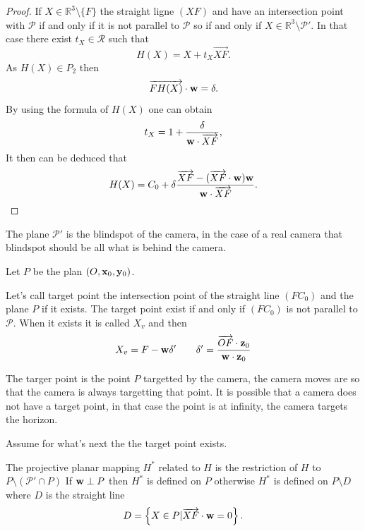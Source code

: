 \begin{proof}
If $X\in \mathbb{R}^3 \setminus \{F\}$ the straight ligne $(XF)$ and have an intersection point with $\mathcal{P}$ if and only if it is not parallel to  $\mathcal{P}$ so if and only if $X\in \mathbb{R}^3 \setminus \mathcal{P}'$. In that case there exist $t_X\in \mathcal{R}$ such that
\begin{equation*}
H(X)=X+t_{X}\overrightarrow{XF}.
\end{equation*}
As $H(X)\in P_{2}$ then
\begin{equation*}
\overrightarrow{FH(X)}\cdot \mathbf{w} =\delta.
\end{equation*}
By using the formula of $H(X)$ one can obtain
\begin{equation*}
t_{X}=1+\frac{\delta}{\mathbf{w} \cdot \overrightarrow{XF}},
\end{equation*}
 It then can be deduced that
\begin{equation*}
H(X) = C_0 +  \delta \frac{\overrightarrow{XF}-(\overrightarrow{XF}\cdot \mathbf{w} )\mathbf{w}}{\mathbf{w} \cdot \overrightarrow{XF}}.
\end{equation*}
\end{proof}
\begin{remarque}
The plane $\mathcal{P}'$ is the blindspot of the camera, in the case of a real camera that blindspot should be all what is behind the camera.
\end{remarque}
Let $P$ be the plan $(O,\mathbf{x}_0,\mathbf{y}_0)$.
\begin{Def} Let's call target point the intersection point of the straight line $(FC_0)$ and the plane $P$ if it exists. The target point exist if and only if $(FC_0)$ is not parallel to $\mathcal{P}$. When it exists it is called $X_v$ and then
\begin{equation*}
X_v=F-\mathbf{w} \delta'~~~~~~\delta'=\frac{\overrightarrow{OF}\cdot \mathbf{z}_0}{\mathbf{w} \cdot \mathbf{z}_0}
\label{formule_point_vise}
\end{equation*}
\label{point_vise}
\end{Def}
\begin{remarque}
The targer point is the point $P$ targetted by the camera, the camera moves are so that the camera is always targetting that point. It is possible that a camera does not have a target point, in that case the point is at infinity, the camera targets the horizon.
\end{remarque}
Assume for what's next the the target point exists.
\begin{Def}
The projective planar mapping $H^*$ related to $H$ is the restriction of $H$ to $P\setminus (\mathcal{P}'\cap P)$ 
If $\mathbf{w} \perp P $ then $H^*$ is defined on $P$ otherwise $H^*$ is defined on $P\setminus D$ where $D$ is the straight line
\begin{equation*}
D=\left\{ X\in P | \overrightarrow{XF}\cdot \mathbf{w} = 0\right\}.
\end{equation*}
\end{Def}
